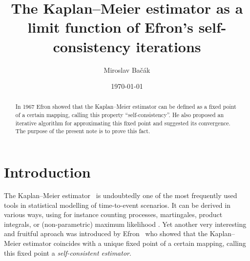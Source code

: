 \documentclass{amsart}
\theoremstyle{plain}
\theoremstyle{definition}
\begin{document}
\title[Self-consistency]{The Kaplan--Meier estimator as a limit function of Efron's self-consistency iterations}

\date{\today}

\author[M. Ba\v{c}\'ak]{Miroslav Ba\v{c}\'ak}
\address{University of Leipzig, Faculty of Medicine, Clinical Trial Centre, Haertelstr. 16--18, 04107 Leipzig, Germany}


\begin{abstract}
In 1967 Efron showed that the Kaplan--Meier estimator can be defined as a fixed point of a certain mapping, calling this property ``self-consistency''. He also proposed an iterative algorithm for approximating this fixed point and suggested its convergence. The purpose of the present note is to prove this fact. 
\end{abstract}

\maketitle

\section{Introduction}

The Kaplan--Meier estimator~\cite{kaplan-meier} is undoubtedly one of the most frequently used tools in statistical modelling of time-to-event scenarios. It can be derived in various ways, using for instance counting processes, martingales, product integrals, or (non-parametric) maximum likelihood \cite{andersen-et-al,fleming-harrington,martinussen-scheike}. Yet another very interesting and fruitful aproach was introduced by Efron~\cite{efron} who showed that the Kaplan--Meier estimator coincides with a unique fixed point of a certain mapping, calling this fixed point a \emph{self-consistent estimator}.
\end{document}
